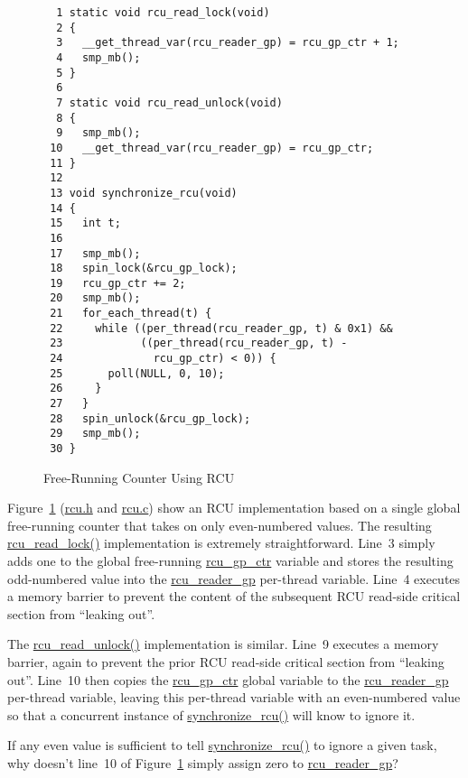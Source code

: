 \begin{figure}[tbp]
{ \scriptsize
\begin{verbatim}
  1 static void rcu_read_lock(void)
  2 {
  3   __get_thread_var(rcu_reader_gp) = rcu_gp_ctr + 1;
  4   smp_mb();
  5 }
  6 
  7 static void rcu_read_unlock(void)
  8 {
  9   smp_mb();
 10   __get_thread_var(rcu_reader_gp) = rcu_gp_ctr;
 11 }
 12 
 13 void synchronize_rcu(void)
 14 {
 15   int t;
 16 
 17   smp_mb();
 18   spin_lock(&rcu_gp_lock);
 19   rcu_gp_ctr += 2;
 20   smp_mb();
 21   for_each_thread(t) {
 22     while ((per_thread(rcu_reader_gp, t) & 0x1) &&
 23            ((per_thread(rcu_reader_gp, t) -
 24              rcu_gp_ctr) < 0)) {
 25       poll(NULL, 0, 10);
 26     }
 27   }
 28   spin_unlock(&rcu_gp_lock);
 29   smp_mb();
 30 }
\end{verbatim}
}
\caption{Free-Running Counter Using RCU}
\label{fig:defer:Free-Running Counter Using RCU}
\end{figure}

Figure~\ref{fig:defer:Free-Running Counter Using RCU}
(\url{rcu.h} and \url{rcu.c})
show an RCU implementation based on a single global free-running counter
that takes on only even-numbered values.
The resulting \url{rcu_read_lock()} implementation is extremely
straightforward.
Line~3 simply adds one to the global free-running \url{rcu_gp_ctr}
variable and stores the resulting odd-numbered value into the
\url{rcu_reader_gp} per-thread variable.
Line~4 executes a memory barrier to prevent the content of the
subsequent RCU read-side critical section from ``leaking out''.

The \url{rcu_read_unlock()} implementation is similar.
Line~9 executes a memory barrier, again to prevent the prior RCU
read-side critical section from ``leaking out''.
Line~10 then copies the \url{rcu_gp_ctr} global variable to the
\url{rcu_reader_gp} per-thread variable, leaving this per-thread
variable with an even-numbered value so that a concurrent instance
of \url{synchronize_rcu()} will know to ignore it.

\QuickQuiz{}
	If any even value is sufficient to tell \url{synchronize_rcu()}
	to ignore a given task, why doesn't line~10 of
	Figure~\ref{fig:defer:Free-Running Counter Using RCU}
	simply assign zero to \url{rcu_reader_gp}?
 \QuickQuizEnd

